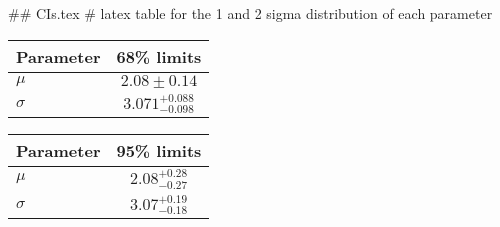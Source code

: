 ## CIs.tex
# latex table for the 1 and 2 sigma distribution of each parameter

\begin{tabular} { l  c}
 Parameter &  68\% limits\\
\hline
{\boldmath$\mu            $} & $2.08\pm 0.14              $\\
{\boldmath$\sigma         $} & $3.071^{+0.088}_{-0.098}   $\\
\hline
\end{tabular}

\begin{tabular} { l  c}
 Parameter &  95\% limits\\
\hline
{\boldmath$\mu            $} & $2.08^{+0.28}_{-0.27}      $\\
{\boldmath$\sigma         $} & $3.07^{+0.19}_{-0.18}      $\\
\hline
\end{tabular}
